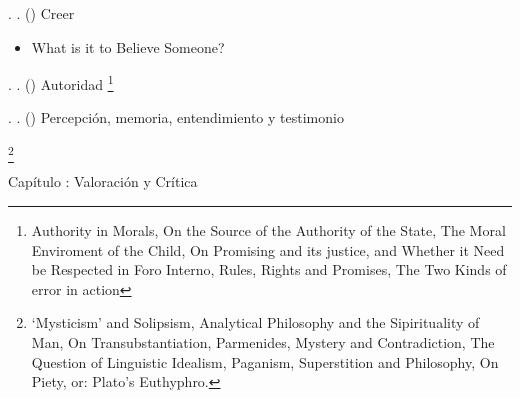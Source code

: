 \documentclass[11pt]{article}
\begin{document}
{\begin{spacing}{1.7}
\tab \tab \tab {}. 
. 
()
Creer

\begin{itemize}[leftmargin=2in]
\item What is it to Believe Someone?
\end{itemize}

\tab \tab \tab {}. 
. 
()
Autoridad
\footnote{
Authority in Morals, 
On the Source of the Authority of the State, 
The Moral Enviroment of the Child, 
On Promising and its justice, and Whether it Need be Respected in Foro Interno, 
Rules, Rights and Promises, 
The Two Kinds of error in action
}

\tab \tab \tab {}. 
. 
()
Percepción, memoria, entendimiento y testimonio

\tab {}
\footnote{
`Mysticism' and Solipsism, 
Analytical Philosophy and the Sipirituality of Man, 
On Transubstantiation, 
Parmenides, Mystery and Contradiction, 
The Question of Linguistic Idealism, 
Paganism, Superstition and Philosophy, 
On Piety, or: Plato's Euthyphro.
}

{\LARGE Capítulo : 
Valoración y Crítica}




\end{spacing}
}
\end{document}
